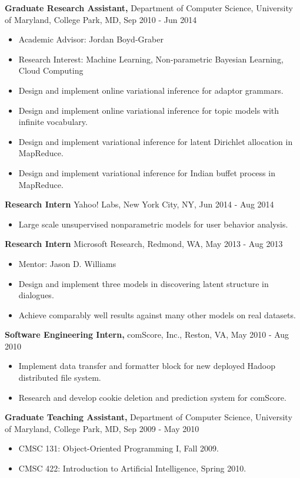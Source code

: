 \documentclass{style/resume}
\begin{document}
\begin{resume}
  {\bf Graduate Research Assistant,} Department of Computer Science,
  University of Maryland, College Park, MD, Sep 2010 - Jun 2014
  \begin{itemize}
  \item Academic Advisor: Jordan Boyd-Graber
  \item Research Interest: Machine Learning, Non-parametric Bayesian
    Learning, Cloud Computing
  \item Design and implement online variational inference for adaptor grammars.
  \item Design and implement online variational inference for topic models with infinite vocabulary.
  \item Design and implement variational inference for latent Dirichlet allocation in MapReduce.
  \item Design and implement variational inference for Indian buffet process in MapReduce.
  \end{itemize}

  {\bf Research Intern} Yahoo! Labs, New York City, NY, Jun 2014 - Aug 2014
  \begin{itemize}
  \item Large scale unsupervised nonparametric models for user behavior analysis.
  \end{itemize}

  {\bf Research Intern} Microsoft Research, Redmond, WA, May 2013 - Aug 2013
  \begin{itemize}
  \item Mentor: Jason D. Williams
  \item Design and implement three models in discovering latent structure in dialogues.
  \item Achieve comparably well results against many other models on real datasets.
  \end{itemize}

  {\bf Software Engineering Intern,} comScore, Inc., Reston, VA, May 2010 - Aug 2010
  \begin{itemize}
  \item Implement data transfer and formatter block for new deployed Hadoop distributed file system.
  \item Research and develop cookie deletion and prediction system for comScore.
  \end{itemize}

  {\bf Graduate Teaching Assistant,} Department of Computer Science, University of Maryland, College Park, MD, Sep 2009 - May 2010
  \begin{itemize}
  \item CMSC 131: Object-Oriented Programming I, Fall 2009.
  \item CMSC 422: Introduction to Artificial Intelligence, Spring 2010.
  \end{itemize}
  

\end{resume}
\end{document}
